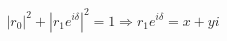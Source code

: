 \documentclass[preview]{standalone}
\begin{document}
\begin{align*}
|r_0|^2 + |r_1 e^{i\delta}|^2 = 1 \Rightarrow r_1 e^{i\delta}  = x + yi
\end{align*}
\end{document}
